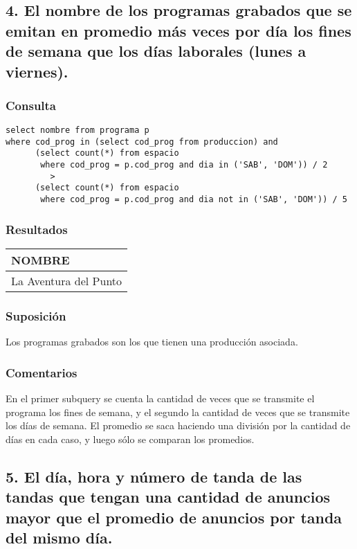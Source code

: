 \subsection*{4. \normalsize{El nombre de los programas grabados que se emitan en promedio m\'as veces por d\'ia los fines de semana que los d\'ias laborales (lunes a viernes).}}

\subsubsection*{Consulta}
\begin{lstlisting} 
select nombre from programa p
where cod_prog in (select cod_prog from produccion) and
      (select count(*) from espacio
       where cod_prog = p.cod_prog and dia in ('SAB', 'DOM')) / 2 
         >
      (select count(*) from espacio
       where cod_prog = p.cod_prog and dia not in ('SAB', 'DOM')) / 5
\end{lstlisting}

\subsubsection*{Resultados}
\begin{tabular}{|l|}
  \hline
    \bf{NOMBRE} \\ 
  \hline
    La Aventura del Punto \\ 
  \hline
\end{tabular} 


\subsubsection*{Suposici\'on}
Los programas grabados son los que tienen una producci\'on asociada. \\

\subsubsection*{Comentarios}
En el primer subquery se cuenta la cantidad de veces que se transmite el programa los fines de semana, y el segundo la cantidad de veces que se transmite los d\'ias de semana. El promedio se saca haciendo una divisi\'on por la cantidad de d\'ias en cada caso, y luego s\'olo se comparan los promedios.


\subsection*{5. \normalsize{El d\'ia, hora y n\'umero de tanda de las tandas que tengan una cantidad de anuncios mayor que el promedio de anuncios por tanda del mismo d\'ia.}}

